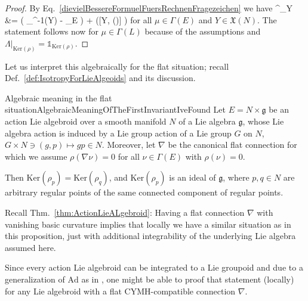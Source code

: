 \begin{proof}
\leavevmode\newline
By Eq.~\eqref{dievielBessereFormuelFuersRechnenFragezeichen} we have
\bas
\widetilde{\nabla}^\lambda_Y \mu
&=
\Lambda \mleft( \nabla_{\widehat{\Lambda}^{-1}(Y)} \mu
- _E \mright)
+ \lambda \big([Y, \rho(\mu)] \big)
\eas
for all $\mu\in \Gamma(E)$ and $Y \in \mathfrak{X}(N)$. The statement follows now for $\mu \in \Gamma(L)$ because of the assumptions and $\Lambda|_{\mathrm{Ker}(\rho)} = \mathds{1}_{\mathrm{Ker}(\rho)}$.
\end{proof}

Let us interpret this algebraically for the flat situation; recall Def.~\ref{def:IsotropyForLieAlgeoids} and its discussion.

\begin{propositions}{Algebraic meaning in the flat situation}{AlgebraicMeaningOfTheFirstInvariantIveFound}
Let $E= N \times \mathfrak{g}$ be an action Lie algebroid over a smooth manifold $N$ of a Lie algebra $\mathfrak{g}$, whose Lie algebra action is induced by a Lie group action of a Lie group $G$ on $N$, $G \times N \ni (g,p) \mapsto gp \in N$. Moreover, let $\nabla$ be the canonical flat connection for which we assume $\rho(\nabla \nu) = 0$ for all $\nu \in \Gamma(E)$ with $\rho(\nu)=0$.

Then $\mathrm{Ker}(\rho_p) = \mathrm{Ker}(\rho_q)$, and $\mathrm{Ker}(\rho_p)$ is an ideal of $\mathfrak{g}$, where $p, q \in N$ are arbitrary regular points of the same connected component of regular points.
\end{propositions}

\begin{remark}
\leavevmode\newline
Recall Thm.~\ref{thm:ActionLieALgebroid}: Having a flat connection $\nabla$ with vanishing basic curvature implies that locally we have a similar situation as in this proposition, just with additional integrability of the underlying Lie algebra assumed here.

Since every action Lie algebroid can be integrated to a Lie groupoid and due to a generalization of $\mathrm{Ad}$ as in \cite[Section 3.7, especially Prop. 3.7.1 (iii); page 141ff.]{mackenzieGeneralTheory}, one might be able to proof that statement (locally) for any Lie algebroid with a flat CYMH-compatible connection $\nabla$.
\end{remark}

